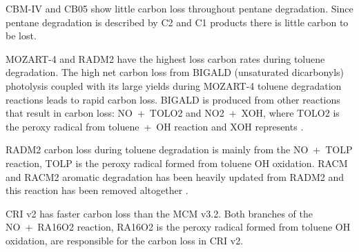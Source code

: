 CBM-IV and CB05 show little carbon loss throughout pentane degradation.
Since pentane degradation is described by C2 and C1 products there is little carbon to be lost.

MOZART-4 and RADM2 have the highest loss carbon rates during toluene degradation.
The high net carbon loss from BIGALD (unsaturated dicarbonyls) photolysis coupled with its large yields during MOZART-4 toluene degradation reactions leads to rapid carbon loss.
BIGALD is produced from other reactions that result in carbon loss: \mbox{NO + TOLO2} and \mbox{NO2 + XOH}, where TOLO2 is the peroxy radical from \mbox{toluene + OH} reaction and XOH represents  \citep{Emmons:2010}.

RADM2 carbon loss during toluene degradation is mainly from the \mbox{NO + TOLP} reaction, TOLP is the peroxy radical formed from toluene OH oxidation.
RACM and RACM2 aromatic degradation has been heavily updated from RADM2 and this reaction has been removed altogether \citep{Stockwell:1997, Goliff:2013}.

CRI v2 has faster carbon loss than the MCM v3.2.
Both branches of the \mbox{NO + RA16O2} reaction, RA16O2 is the peroxy radical formed from toluene OH oxidation, are responsible for the carbon loss in CRI v2.


